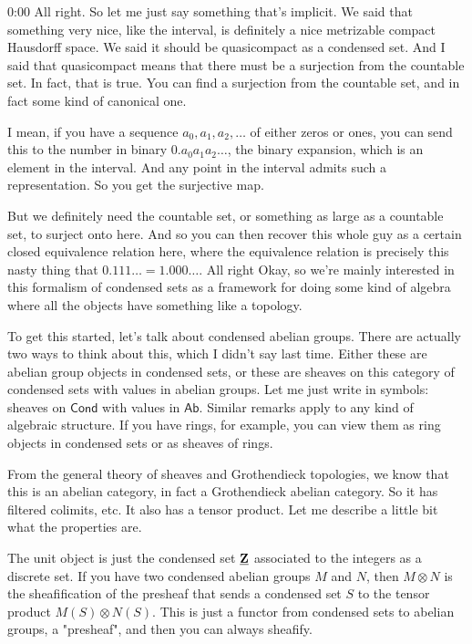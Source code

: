 \begin{unfinished}{0:00}
All right. So let me just say something that's implicit. We said that something very nice, like the interval, is definitely a nice metrizable compact Hausdorff space. We said it should be quasicompact as a condensed set. And I said that quasicompact means that there must be a surjection from the countable set. In fact, that is true. You can find a surjection from the countable set, and in fact some kind of canonical one.

I mean, if you have a sequence $a_0, a_1, a_2, \ldots$ of either zeros or ones, you can send this to the number in binary $0.a_0 a_1 a_2 \ldots$, the binary expansion, which is an element in the interval. And any point in the interval admits such a representation. So you get the surjective map.

But we definitely need the countable set, or something as large as a countable set, to surject onto here. And so you can then recover this whole guy as a certain closed equivalence relation here, where the equivalence relation is precisely this nasty thing that $0.111\ldots = 1.000\ldots$. All right
Okay, so we're mainly interested in this formalism of condensed sets as a framework for doing some kind of algebra where all the objects have something like a topology.

To get this started, let's talk about condensed abelian groups. There are actually two ways to think about this, which I didn't say last time. Either these are abelian group objects in condensed sets, or these are sheaves on this category of condensed sets with values in abelian groups. Let me just write in symbols: sheaves on $\mathsf{Cond}$ with values in $\mathsf{Ab}$. Similar remarks apply to any kind of algebraic structure. If you have rings, for example, you can view them as ring objects in condensed sets or as sheaves of rings.

From the general theory of sheaves and Grothendieck topologies, we know that this is an abelian category, in fact a Grothendieck abelian category. So it has filtered colimits, etc. It also has a tensor product. Let me describe a little bit what the properties are.

The unit object is just the condensed set $\underline{\mathbf Z}$ associated to the integers as a discrete set. If you have two condensed abelian groups $M$ and $N$, then $M\otimes N$ is the sheafification of the presheaf that sends a condensed set $S$ to the tensor product $M(S)\otimes N(S)$. This is just a functor from condensed sets to abelian groups, a "presheaf", and then you can always sheafify.


\end{unfinished}
